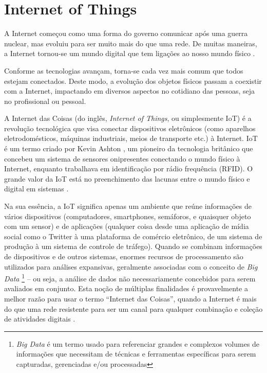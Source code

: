 \section{Internet of Things}
\label{sec:iot}

A Internet começou como uma forma do governo comunicar após uma guerra nuclear, mas evoluiu para ser muito mais do que uma rede. De muitas maneiras, a Internet tornou-se um mundo digital que tem ligações ao nosso mundo físico \cite{BrasilEscola}.

Conforme as tecnologias avançam, torna-se cada vez mais comum que todos estejam conectados. Deste modo, a evolução dos objetos físicos passam a coexistir com a Internet, impactando em diversos aspectos no cotidiano das pessoas, seja no profissional ou pessoal.

A Internet das Coisas (do inglês, \textit{Internet of Things}, ou simplesmente IoT) é a revolução tecnológica que visa conectar dispositivos eletrônicos (como aparelhos eletrodomésticos, máquinas industriais, meios de transporte etc.) à Internet. IoT é um termo criado por Kevin Ashton \cite{Kevin}, um pioneiro da tecnologia britânico que concebeu um sistema de sensores onipresentes conectando o mundo físico à Internet, enquanto trabalhava em identificação por rádio frequência (RFID). O grande valor da IoT está no preenchimento das lacunas entre o mundo físico e digital em sistemas \cite{Amazon}.

Na sua essência, a IoT significa apenas um ambiente que reúne informações de vários dispositivos (computadores, smartphones, semáforos, e quaisquer objeto com um sensor) e de aplicações (qualquer coisa desde uma aplicação de mídia social como o Twitter à uma plataforma de comércio eletrônico, de um sistema de produção à um sistema de controle de tráfego). Quando se combinam informações de dispositivos e de outros sistemas, enormes recursos de processamento são utilizados para análises expansivas, geralmente associadas com o conceito de \textit{Big Data} \footnote{\textit{Big Data} é um termo usado para referenciar grandes e complexos volumes de informações que necessitam de técnicas e ferramentas específicas para serem capturadas, gerenciadas e/ou processadas} – ou seja, a análise de dados não necessariamente concebidos para serem avaliados em conjunto. Esta noção de múltiplas finalidades é provavelmente a melhor razão para usar o termo “Internet das Coisas”, quando a Internet é mais do que uma rede resistente para ser um canal para qualquer combinação e coleção de atividades digitais \cite{ComputerWorld}.

